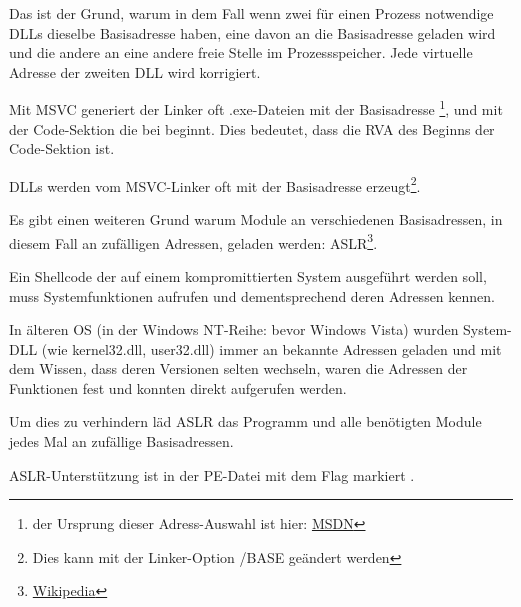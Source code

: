 Das ist der Grund, warum in dem Fall wenn zwei für einen Prozess notwendige DLLs
dieselbe Basisadresse haben, eine davon an die Basisadresse geladen wird und die
andere an eine andere freie Stelle im Prozessspeicher. Jede virtuelle Adresse der
zweiten DLL wird korrigiert.

\par Mit \ac{MSVC} generiert der Linker oft .exe-Dateien mit der Basisadresse
\footnote{der Ursprung dieser Adress-Auswahl ist hier: \href{http://go.yurichev.com/17041}{MSDN}},
und mit der Code-Sektion die bei  beginnt.
Dies bedeutet, dass die \ac{RVA} des Beginns der Code-Sektion  ist.

DLLs werden vom MSVC-Linker oft mit der Basisadresse 
erzeugt\footnote{Dies kann mit der Linker-Option /BASE geändert werden}.


Es gibt einen weiteren Grund warum Module an verschiedenen Basisadressen, in diesem
Fall an zufälligen Adressen, geladen werden: \ac{ASLR}\footnote{\href{http://go.yurichev.com/17140}{Wikipedia}}.


Ein Shellcode der auf einem kompromittierten System ausgeführt werden soll, muss
Systemfunktionen aufrufen und dementsprechend deren Adressen kennen.

In älteren \ac{OS} (in der \gls{Windows NT}-Reihe: bevor Windows Vista) wurden
System-DLL (wie kernel32.dll, user32.dll) immer an bekannte Adressen geladen und
mit dem Wissen, dass deren Versionen selten wechseln, waren die Adressen der Funktionen
fest und konnten direkt aufgerufen werden.

Um dies zu verhindern läd \ac{ASLR} das Programm und alle benötigten Module jedes
Mal an zufällige Basisadressen.

\ac{ASLR}-Unterstützung ist in der PE-Datei mit dem Flag
 markiert .

